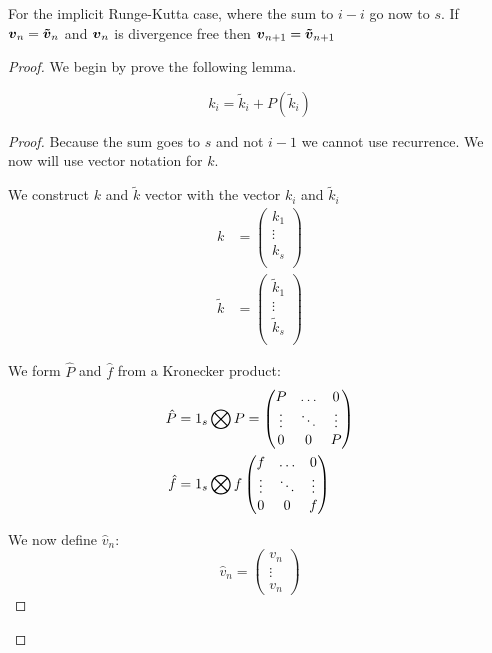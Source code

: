 \begin{thm}
For the implicit Runge-Kutta case, where the sum to $i-i$ go now to $s$.
If ${\boldsymbol {v}}_{n}={\boldsymbol {\tilde{v}}}_{n}$ and ${\boldsymbol {v}}_n$ is divergence free then ${\boldsymbol {v}}_{n+1}={\boldsymbol {\tilde{v}}}_{n+1}$ 
\end{thm}
\begin{proof}
We begin by prove the following lemma.
\begin{lem}
\begin{equation}
  k_{i}=\tilde{k}_{i}+P(\tilde{k}_{i})
\end{equation}
\end{lem}
\begin{proof}
Because the sum goes to $s$ and not $i-1$ we cannot use recurrence.
We now will use vector notation for $k$.

We construct $k$ and $\tilde{k}$ vector with the vector $k_{i}$ and $\tilde{k}_{i}$
\begin{align}
k&=\begin{pmatrix}
    k_{1}\\
    \vdots\\
    k_{s}\\
  \end{pmatrix}\\
\tilde{k}&=\begin{pmatrix}
    \tilde{k}_{1}\\
    \vdots\\
    \tilde{k}_{s}\\
  \end{pmatrix}
\end{align}

We form $\hat{P}$ and $\hat{f}$ from a Kronecker product:
\begin{align}
\hat{P}&=1_{s}\bigotimes P=\begin{pmatrix}P	&\ldots	&0\\
			\vdots &\ddots 	&\vdots\\
			0	&0	&P\\
	\end{pmatrix}\\
\hat{f}&=1_{s}\bigotimes f\begin{pmatrix}f	&\ldots	&0\\
			\vdots &\ddots 	&\vdots\\
			0	&0	&f\\
	\end{pmatrix}
\end{align}

We now define $\hat{v}_n$:
\begin{equation}
\hat{v}_{n}=\begin{pmatrix}
	      v_{n}\\
	      \vdots\\
	      v_{n}
	      \end{pmatrix}
\end{equation}


\end{proof}
\end{proof}
